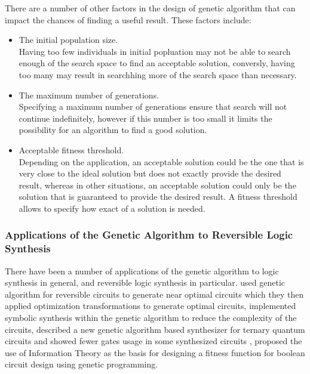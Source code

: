 There are a number of other factors in the design of genetic algorithm that can impact the chances of finding a useful result. 
These factors include:
\begin{itemize}
 \item The initial population size.
\\ Having too few individuals in initial popluation may not be able to search enough of the search space to 
find an acceptable solution, conversly, having too many may result in searchhing more of the search space than necessary.
 \item The maximum number of generations.
\\ Specifying a maximum number of generations ensure that search will not continue indefinitely, however if this number is too 
small it limits the possibility for an algorithm to find a good solution.
 \item Acceptable fitness threshold.
\\Depending on the application, an acceptable solution could be the one that is very close to the ideal solution but does not exactly provide the
desired result, whereas in other situations, an acceptable solution could only be the solution that is guaranteed to provide the desired result. 
A fitness threshold allows to specify how exact of a solution is needed.  
\end{itemize}
 

\subsubsection{Applications of the Genetic Algorithm to Reversible Logic Synthesis}

There have been a number of applications of the genetic algorithm to logic synthesis in general, and reversible logic synthesis in 
particular. \cite{Lukac2003} used genetic algorithm for reversible circuits to generate near optimal circuits which they then applied 
optimization transformations to generate optimal circuits, 
\cite{Lukac2008} implemented symbolic synthesis within the genetic algorithm to reduce the complexity of the circuits, 
\cite{Khan2004} described a new genetic algorithm based synthesizer for ternary quantum circuits and showed fewer gates usage in some synthesized circuits , 
\cite{Aguirre2003} proposed the use of Information Theory as the basis for designing a fitness function for boolean circuit design using 
genetic programming.